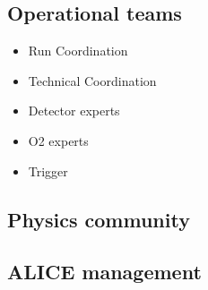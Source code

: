 \subsection{Operational teams}
\begin{itemize}
  \item Run Coordination
  \item Technical Coordination
  \item Detector experts
  \item O2 experts
  \item Trigger
\end{itemize}

\subsection{Physics community}

\subsection{ALICE management}

